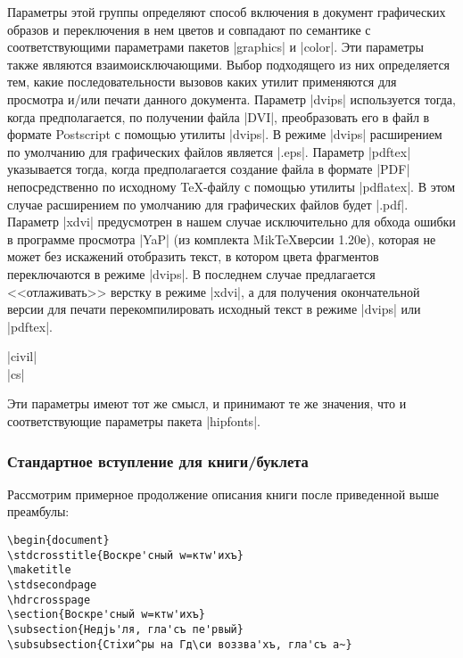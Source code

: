 \documentclass{ltxguide}
\begin{document}
Параметры этой группы определяют способ включения в документ графических
образов и переключения в нем цветов и совпадают по семантике с
соответствующими параметрами пакетов |graphics| и |color|. Эти параметры также
являются взаимоисключающими. Выбор подходящего из них определяется тем, какие
последовательности вызовов каких утилит применяются для просмотра и/или печати
данного документа. Параметр |dvips| используется тогда, когда предполагается,
по получении файла |DVI|, преобразовать его в файл в формате Postscript с
помощью утилиты |dvips|. В режиме |dvips| расширением по умолчанию для
графических файлов является |.eps|.  Параметр |pdftex| указывается тогда,
когда предполагается создание файла в формате |PDF| непосредственно по
исходному \TeX-файлу с помощью утилиты |pdflatex|. В этом случае расширением
по умолчанию для графических файлов будет |.pdf|. Параметр |xdvi| предусмотрен
в нашем случае исключительно для обхода ошибки в программе просмотра |YaP| (из
комплекта Mik\TeX версии 1.20е), которая не может без искажений отобразить
текст, в котором цвета фрагментов переключаются в режиме |dvips|. В последнем
случае предлагается <<отлаживать>> верстку в режиме |xdvi|, а для получения
окончательной версии для печати перекомпилировать исходный текст в режиме
|dvips| или |pdftex|.

\begin{decl}
  |civil|\\
  |cs|
\end{decl}

Эти параметры имеют тот же смысл, и принимают те же значения, что и
соответствующие параметры пакета |hipfonts|.

\subsubsection{Стандартное вступление для книги/буклета}

Рассмотрим примерное продолжение описания книги после приведенной выше
преамбулы:

\begin{verbatim}
\begin{document}
\stdcrosstitle{Вoскре'сный w=ктw'ихъ}
\maketitle
\stdsecondpage
\hdrcrosspage
\section{Вoскре'сный w=ктw'ихъ}
\subsection{Недjь'ля, гла'съ пе'рвый}
\subsubsection{Стiхи^ры на Гд\си воззва'хъ, гла'съ а~}
\end{verbatim}
\end{document}
